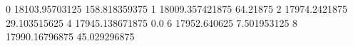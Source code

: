 0 18103.95703125 158.818359375
1 18009.357421875 64.21875
2 17974.2421875 29.103515625
4 17945.138671875 0.0
6 17952.640625 7.501953125
8 17990.16796875 45.029296875
